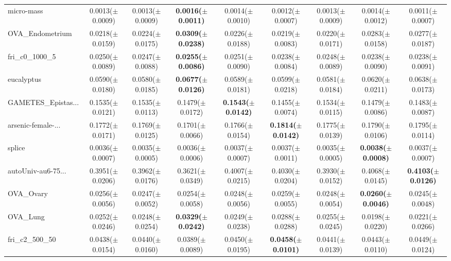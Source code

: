 \begin{longtable}{lcccccccc}
micro-mass & 0.0013($\pm$0.0009) & 0.0013($\pm$0.0009) & \textbf{0.0016($\pm$0.0011)} & 0.0014($\pm$0.0010) & 0.0012($\pm$0.0007) & 0.0013($\pm$0.0009) & 0.0014($\pm$0.0012) & 0.0011($\pm$0.0007) \\
OVA\_Endometrium & 0.0218($\pm$0.0159) & 0.0224($\pm$0.0175) & \textbf{0.0309($\pm$0.0238)} & 0.0226($\pm$0.0188) & 0.0219($\pm$0.0083) & 0.0220($\pm$0.0171) & 0.0283($\pm$0.0158) & 0.0277($\pm$0.0187) \\
fri\_c0\_1000\_5 & 0.0250($\pm$0.0089) & 0.0247($\pm$0.0088) & \textbf{0.0255($\pm$0.0086)} & 0.0251($\pm$0.0090) & 0.0238($\pm$0.0084) & 0.0248($\pm$0.0089) & 0.0238($\pm$0.0090) & 0.0238($\pm$0.0091) \\
eucalyptus & 0.0590($\pm$0.0180) & 0.0580($\pm$0.0185) & \textbf{0.0677($\pm$0.0126)} & 0.0589($\pm$0.0181) & 0.0599($\pm$0.0218) & 0.0581($\pm$0.0184) & 0.0620($\pm$0.0211) & 0.0638($\pm$0.0173) \\
GAMETES\_Epistas... & 0.1535($\pm$0.0121) & 0.1535($\pm$0.0113) & 0.1479($\pm$0.0172) & \textbf{0.1543($\pm$0.0142)} & 0.1455($\pm$0.0074) & 0.1534($\pm$0.0115) & 0.1479($\pm$0.0086) & 0.1483($\pm$0.0087) \\
arsenic-female-... & 0.1772($\pm$0.0171) & 0.1769($\pm$0.0125) & 0.1701($\pm$0.0066) & 0.1766($\pm$0.0154) & \textbf{0.1814($\pm$0.0142)} & 0.1775($\pm$0.0139) & 0.1790($\pm$0.0106) & 0.1795($\pm$0.0114) \\
splice & 0.0036($\pm$0.0007) & 0.0035($\pm$0.0005) & 0.0036($\pm$0.0006) & 0.0037($\pm$0.0007) & 0.0037($\pm$0.0011) & 0.0035($\pm$0.0005) & \textbf{0.0038($\pm$0.0008)} & 0.0037($\pm$0.0007) \\
autoUniv-au6-75... & 0.3951($\pm$0.0206) & 0.3962($\pm$0.0176) & 0.3621($\pm$0.0349) & 0.4007($\pm$0.0215) & 0.4030($\pm$0.0204) & 0.3930($\pm$0.0152) & 0.4068($\pm$0.0145) & \textbf{0.4103($\pm$0.0126)} \\
OVA\_Ovary & 0.0256($\pm$0.0056) & 0.0247($\pm$0.0052) & 0.0254($\pm$0.0058) & 0.0248($\pm$0.0056) & 0.0259($\pm$0.0055) & 0.0248($\pm$0.0054) & \textbf{0.0260($\pm$0.0046)} & 0.0245($\pm$0.0048) \\
OVA\_Lung & 0.0252($\pm$0.0246) & 0.0248($\pm$0.0254) & \textbf{0.0329($\pm$0.0242)} & 0.0249($\pm$0.0238) & 0.0288($\pm$0.0288) & 0.0255($\pm$0.0245) & 0.0198($\pm$0.0220) & 0.0221($\pm$0.0266) \\
fri\_c2\_500\_50 & 0.0438($\pm$0.0154) & 0.0440($\pm$0.0160) & 0.0389($\pm$0.0089) & 0.0450($\pm$0.0195) & \textbf{0.0458($\pm$0.0101)} & 0.0441($\pm$0.0139) & 0.0443($\pm$0.0110) & 0.0449($\pm$0.0124) \\

\end{longtable}
